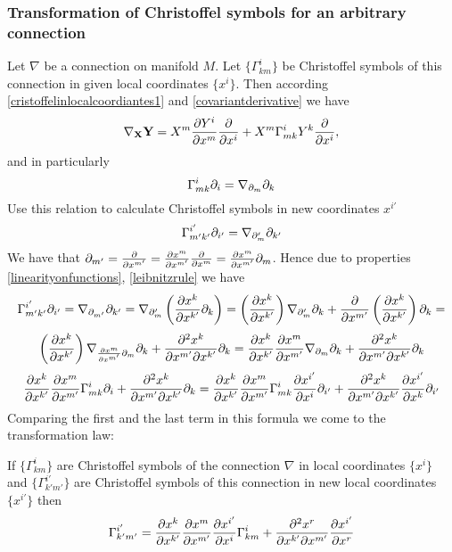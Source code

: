 \documentclass[12pt]{article}
\theoremstyle{theorem}
\numberwithin{equation}{section}
\begin{document}
\subsubsection {Transformation of Christoffel 
symbols for an arbitrary connection}\label{newparagraph2020}


 Let $\nabla$ be a connection on manifold $M$.
  Let $\{\Gamma^i_{km}\}$ be Christoffel symbols of this connection in  given local coordinates $\{x^i\}$.
  Then according \eqref{cristoffelinlocalcoordiantes1} and \eqref{covariantderivative} we have
                 $$
              \nabla_{\bf X}{\bf Y}=X^m{\partial Y^i\over \partial x^m}{\partial\over \partial x^i}+X^m\Gamma^i_{mk}Y^k{\partial\over \partial x^i},
                 $$
and in particularly
               $$
               \Gamma^i_{mk}\partial_i=\nabla_{\partial_m}\partial_k
               $$
  Use this relation to calculate Christoffel symbols in new coordinates $x^{i'}$
               $$
            \Gamma^{i'}_{m'k'}\partial_{i'}=
            \nabla_{\partial_m'}\partial_{k'}
               $$
  We have that $\partial_{m'}={\partial\over \partial x^{m'}}={\partial x^m\over \partial x^{m'}}{\partial\over \partial x^{m}}= {\partial x^m\over \partial x^{m'}}\partial_m $.
  Hence due to properties \eqref{linearityonfunctions}, \eqref{leibnitzrule} we have
    $$
          \Gamma^{i'}_{m'k'}\partial_{i'}=
            \nabla_{\partial_{m'}}\partial_{k'}=\nabla_{\partial_m'}\left({\partial x^k\over \partial x^{k'}}\partial_{k}\right)=
            \left({\partial x^k\over \partial x^{k'}}\right)\nabla_{\partial_m'}\partial_{k}+
            {\partial\over \partial x^{m'}}\left({\partial x^k\over \partial x^{k'}}\right)\partial_{k}=
    $$
              $$
    \left({\partial x^k\over \partial x^{k'}}\right)\nabla_{{\partial x^m\over \partial x^{m'}}\partial_m}\partial_{k}+
            {\partial^2  x^k\over \partial x^{m'}\partial x^{k'}}\partial_{k}=
                      {\partial x^k\over \partial x^{k'}}
          {\partial x^m\over \partial x^{m'}}
          \nabla_{\partial_m}\partial_{k}+
           {\partial^2  x^k\over \partial x^{m'}\partial x^{k'}}\partial_{k}
          $$
          $$
     {\partial x^k\over \partial x^{k'}}
          {\partial x^m\over \partial x^{m'}}
          \Gamma_{mk}^i\partial_i+{\partial^2  x^k\over \partial x^{m'}\partial x^{k'}}\partial_{k}=
          {\partial x^k\over \partial x^{k'}}
          {\partial x^m\over \partial x^{m'}}\Gamma_{mk}^i{\partial x^{i'}\over \partial x^i}\partial_{i'}+
          {\partial^2  x^k\over \partial x^{m'}\partial x^{k'}}{\partial x^{i'}\over \partial x^k}\partial_{i'}
          $$
Comparing the first and the last term in this formula we come to the transformation law:

\m

If $\{\Gamma^i_{km}\}$ are Christoffel symbols of the connection $\nabla$ in  local coordinates $\{x^i\}$
and $\{\Gamma^{i'}_{k'm'}\}$ are Christoffel symbols of this connection  in  new local coordinates $\{x^{i'}\}$
then
 \begin{equation}\label{formualfortransformationofconnection}
    \Gamma^{i'}_{k'm'}=
          {\partial x^k\over \partial x^{k'}}
          {\partial x^m\over \partial x^{m'}}
          {\partial x^{i'}\over \partial x^i}
          \Gamma_{km}^i+
    {\partial^2  x^r\over \partial x^{k'}\partial x^{m'}}{\partial x^{i'}\over \partial x^r}
 \end{equation}
\end{document}
